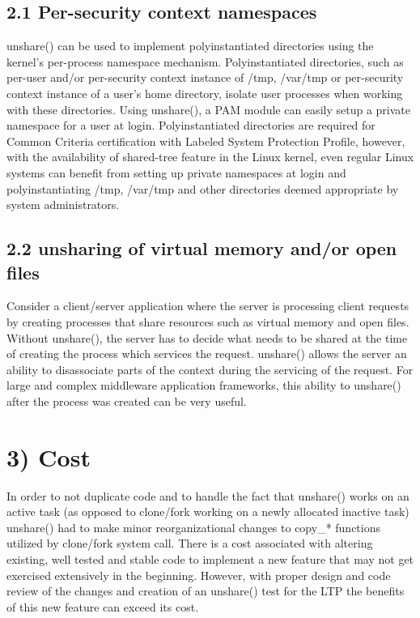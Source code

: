 \documentclass[a4paper,8pt,english]{sphinxmanual}
\begin{document}
\subsection{2.1 Per-security context namespaces}
\label{userspace-api/unshare:per-security-context-namespaces}
unshare() can be used to implement polyinstantiated directories using
the kernel's per-process namespace mechanism. Polyinstantiated directories,
such as per-user and/or per-security context instance of /tmp, /var/tmp or
per-security context instance of a user's home directory, isolate user
processes when working with these directories. Using unshare(), a PAM
module can easily setup a private namespace for a user at login.
Polyinstantiated directories are required for Common Criteria certification
with Labeled System Protection Profile, however, with the availability
of shared-tree feature in the Linux kernel, even regular Linux systems
can benefit from setting up private namespaces at login and
polyinstantiating /tmp, /var/tmp and other directories deemed
appropriate by system administrators.


\subsection{2.2 unsharing of virtual memory and/or open files}
\label{userspace-api/unshare:unsharing-of-virtual-memory-and-or-open-files}
Consider a client/server application where the server is processing
client requests by creating processes that share resources such as
virtual memory and open files. Without unshare(), the server has to
decide what needs to be shared at the time of creating the process
which services the request. unshare() allows the server an ability to
disassociate parts of the context during the servicing of the
request. For large and complex middleware application frameworks, this
ability to unshare() after the process was created can be very
useful.


\section{3) Cost}
\label{userspace-api/unshare:cost}
In order to not duplicate code and to handle the fact that unshare()
works on an active task (as opposed to clone/fork working on a newly
allocated inactive task) unshare() had to make minor reorganizational
changes to copy\_* functions utilized by clone/fork system call.
There is a cost associated with altering existing, well tested and
stable code to implement a new feature that may not get exercised
extensively in the beginning. However, with proper design and code
review of the changes and creation of an unshare() test for the LTP
the benefits of this new feature can exceed its cost.
\end{document}
